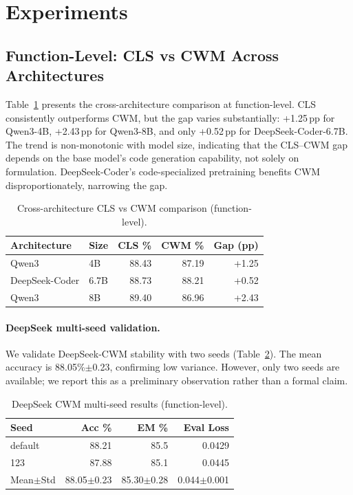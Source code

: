 \documentclass[11pt,a4paper]{article}
\begin{document}
\section{Experiments}

\subsection{Function-Level: CLS vs CWM Across Architectures}

Table~\ref{tab:cross-arch-func} presents the cross-architecture comparison at function-level.
CLS consistently outperforms CWM, but the gap varies substantially: +1.25\,pp for Qwen3-4B, +2.43\,pp for Qwen3-8B, and only +0.52\,pp for DeepSeek-Coder-6.7B.
The trend is non-monotonic with model size, indicating that the CLS--CWM gap depends on the base model's code generation capability, not solely on formulation.
DeepSeek-Coder's code-specialized pretraining benefits CWM disproportionately, narrowing the gap.

\begin{table}[t]
\centering
\small
\begin{tabular}{llrrr}
\toprule
\textbf{Architecture} & \textbf{Size} & \textbf{CLS \%} & \textbf{CWM \%} & \textbf{Gap (pp)} \\
\midrule
Qwen3 & 4B & 88.43 & 87.19 & +1.25 \\
DeepSeek-Coder & 6.7B & 88.73 & 88.21 & +0.52 \\
Qwen3 & 8B & 89.40 & 86.96 & +2.43 \\
\bottomrule
\end{tabular}
\caption{Cross-architecture CLS vs CWM comparison (function-level).}
\label{tab:cross-arch-func}
\end{table}

\paragraph{DeepSeek multi-seed validation.}
We validate DeepSeek-CWM stability with two seeds (Table~\ref{tab:deepseek-seeds}).
The mean accuracy is 88.05\%$\pm$0.23, confirming low variance.
However, only two seeds are available; we report this as a preliminary observation rather than a formal claim.

\begin{table}[t]
\centering
\small
\begin{tabular}{lrrr}
\toprule
\textbf{Seed} & \textbf{Acc \%} & \textbf{EM \%} & \textbf{Eval Loss} \\
\midrule
default & 88.21 & 85.5 & 0.0429 \\
123 & 87.88 & 85.1 & 0.0445 \\
\midrule
Mean$\pm$Std & 88.05$\pm$0.23 & 85.30$\pm$0.28 & 0.044$\pm$0.001 \\
\bottomrule
\end{tabular}
\caption{DeepSeek CWM multi-seed results (function-level).}
\label{tab:deepseek-seeds}
\end{table}
\end{document}
